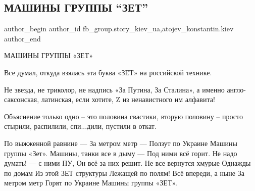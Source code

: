  
 
 
 
 
 
\subsection{МАШИНЫ ГРУППЫ \enquote{ЗЕТ}}
\label{sec:07_03_2022.fb.fb_group.story_kiev_ua.2.mashyny_gruppy_zet}
 
\ifcmt
 author_begin
   author_id fb_group.story_kiev_ua,atojev_konstantin.kiev
 author_end
\fi

МАШИНЫ ГРУППЫ «ЗЕТ»

Все думал, откуда взялась эта буква «ЗЕТ» на российской технике.

Не звезда, не триколор, не надпись «За Путина, За Сталина», а именно
англо-саксонская,  латинская, если хотите, Z из ненавистного им алфавита!


Объяснение только одно – это половина свастики, вторую половину – просто
стырили, распилили, спи...дили, пустили в откат.

\raggedcolumns
\begin{multicols}{2} %
\setlength{\parindent}{0pt}
\obeycr
По выжженной равнине —
За метром метр —
Ползут по Украине
Машины группы «Зет».
\smallskip
Машины, танки все в дыму —
Под ними всё горит.
Не надо думать! — с ними ПУ,
Он всё за них решит.
\smallskip
Не все вернутся хмурые
Однажды по домам
Из этой ЗЕТ структуры
Лежащей по полям!
\smallskip
Всё впереди, а ныне
За метром метр
Горят по Украине
Машины группы «ЗЕТ».
\restorecr
\end{multicols} %


